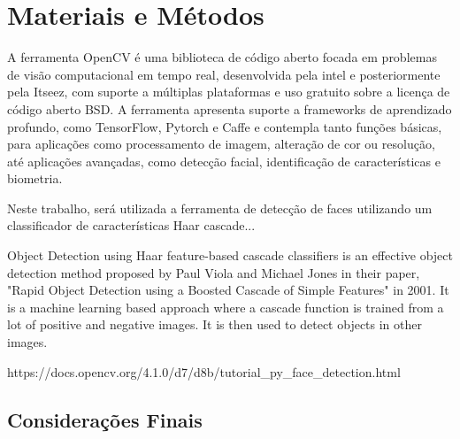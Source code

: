 \chapter{Materiais e Métodos}\label{cap:ferramentas}

A ferramenta OpenCV  é uma biblioteca de código aberto focada em problemas de visão computacional em tempo real, desenvolvida pela intel e posteriormente pela Itseez, com suporte a múltiplas plataformas e uso gratuito sobre a licença de código aberto BSD. A ferramenta apresenta suporte a frameworks de aprendizado profundo, como TensorFlow, Pytorch e Caffe  e contempla tanto funções básicas, para aplicações como processamento de imagem, alteração de cor ou resolução, até aplicações avançadas, como detecção facial, identificação de características e biometria.

Neste trabalho, será utilizada a ferramenta de detecção de faces utilizando um classificador de características Haar cascade...

Object Detection using Haar feature-based cascade classifiers is an effective object detection method proposed by Paul Viola and Michael Jones in their paper, "Rapid Object Detection using a Boosted Cascade of Simple Features" in 2001. It is a machine learning based approach where a cascade function is trained from a lot of positive and negative images. It is then used to detect objects in other images.

https://docs.opencv.org/4.1.0/d7/d8b/tutorial_py_face_detection.html

\section{Considerações Finais}

\lipsum[23]
